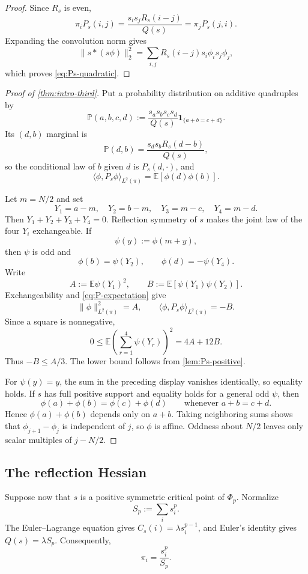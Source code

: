 \documentclass[11pt,reqno]{amsart}
\numberwithin{equation}{section}
\theoremstyle{definition}
\theoremstyle{remark}
\newcommand{\one}{\mathbf 1}
\newcommand{\E}{\mathbb E}
\newcommand{\Pp}{\mathbb P}
\newcommand{\norm}[1]{\lVert #1\rVert}
\newcommand{\ip}[2]{\langle #1,#2\rangle}
\begin{document}
\begin{proof}
Since $R_s$ is even,
\[
  \pi_iP_s(i,j)
  =\frac{s_is_jR_s(i-j)}{Q(s)}
  =\pi_jP_s(j,i).
\]
Expanding the convolution norm gives
\[
  \norm{s*(s\phi)}_2^2
  =\sum_{i,j}R_s(i-j)s_i\phi_i s_j\phi_j,
\]
which proves \eqref{eq:Ps-quadratic}.
\end{proof}

\begin{proof}[Proof of \cref{thm:intro-third}]
Put a probability distribution on additive quadruples by
\begin{equation}\label{eq:quadruple-measure}
  \Pp(a,b,c,d)
  :=\frac{s_as_bs_cs_d}{Q(s)}\one_{\{a+b=c+d\}}.
\end{equation}
Its $(d,b)$ marginal is
\[
  \Pp(d,b)=\frac{s_ds_bR_s(d-b)}{Q(s)},
\]
so the conditional law of $b$ given $d$ is $P_s(d,\cdot)$, and
\begin{equation}\label{eq:P-expectation}
  \ip{\phi}{P_s\phi}_{L^2(\pi)}=\E[\phi(d)\phi(b)].
\end{equation}

Let $m=N/2$ and set
\[
  Y_1=a-m,
  \quad Y_2=b-m,
  \quad Y_3=m-c,
  \quad Y_4=m-d.
\]
Then $Y_1+Y_2+Y_3+Y_4=0$.  Reflection symmetry of $s$ makes the joint law
of the four $Y_i$ exchangeable.  If
\[
  \psi(y):=\phi(m+y),
\]
then $\psi$ is odd and
\[
  \phi(b)=\psi(Y_2),
  \qquad
  \phi(d)=-\psi(Y_4).
\]
Write
\[
  A:=\E\psi(Y_1)^2,
  \qquad
  B:=\E[\psi(Y_1)\psi(Y_2)].
\]
Exchangeability and \eqref{eq:P-expectation} give
\[
  \norm\phi_{L^2(\pi)}^2=A,
  \qquad
  \ip{\phi}{P_s\phi}_{L^2(\pi)}=-B.
\]
Since a square is nonnegative,
\[
  0\le\E\left(\sum_{r=1}^4\psi(Y_r)\right)^2
  =4A+12B.
\]
Thus $-B\le A/3$.  The lower bound follows from
\cref{lem:Ps-positive}.

For $\psi(y)=y$, the sum in the preceding display vanishes identically,
so equality holds.  If $s$ has full positive support and equality holds for
a general odd $\psi$, then
\[
  \phi(a)+\phi(b)=\phi(c)+\phi(d)
  \qquad\text{whenever }a+b=c+d.
\]
Hence $\phi(a)+\phi(b)$ depends only on $a+b$.  Taking neighboring sums
shows that $\phi_{j+1}-\phi_j$ is independent of $j$, so $\phi$ is affine.
Oddness about $N/2$ leaves only scalar multiples of $j-N/2$.
\end{proof}

\subsection{The reflection Hessian}

Suppose now that $s$ is a positive symmetric critical point of $\Phi_p$.
Normalize
\[
  S_p:=\sum_i s_i^p.
\]
The Euler--Lagrange equation gives $C_s(i)=\lambda s_i^{p-1}$, and Euler's
identity gives $Q(s)=\lambda S_p$.  Consequently,
\begin{equation}\label{eq:pi-pmass}
  \pi_i=\frac{s_i^p}{S_p}.
\end{equation}
\end{document}
